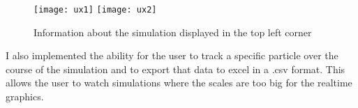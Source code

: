 	\begin{figure}
		\centering
		\texttt{[image: ux1]}
		\texttt{[image: ux2]}
		\caption{Information about the simulation displayed in the top left corner}
		\label{fig:uxImg1}
	\end{figure}

	I also implemented the ability for the user to track a specific particle over the course of the simulation and to export that data to excel in a .csv format. This allows the user to watch simulations where the scales are too big for the realtime graphics.
	
	